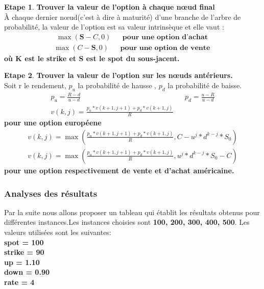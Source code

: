 \documentclass[12pt]{article}
\theoremstyle{definition}
\theoremstyle{definition}
\newtheorem{etape}{Etape}
\begin{document}
\begin{etape}{ \textbf{Trouver la valeur de l’option à chaque nœud final}}\\
\newline
À chaque dernier nœud(c'est à dire à maturité) d’une branche de l’arbre de probabilité, la valeur de l’option est sa valeur intrinsèque et elle vaut :
\boldmath\begin{eqnarray}
\max_{}(\textbf{S} - C, 0) & & \textbf{pour une option d'achat}\
\end{eqnarray}
\boldmath\begin{eqnarray}
\max_{}(C - \textbf{S}, 0) & & \textbf{pour une option de vente}\
\end{eqnarray} 
\textbf{où K est le strike et \textbf{S} est le spot du sous-jacent.}\\
\end{etape}

\begin{etape}{ \textbf{Trouver la valeur de l’option sur les nœuds antérieurs.}}\\
\newline
Soit r le rendement, \textbf{$p_{u}$} la probabilité de hausse , \textbf{$p_{d}$} la probabilité de baisse.
\boldmath\begin{eqnarray}
\textbf{$p_{u}$} = \frac{ R - d}{u - d} && \textbf{$p_{d}$} = \frac{ u - R}{u - d} \\
v(k,j) = \frac{\textbf{$p_{u}$} * v(k+1, j+1) + \textbf{$p_{d}$} * v(k+1, j)}{R} 
\end{eqnarray}
 \textbf{pour une option européene} \\

\boldmath\begin{eqnarray}
v(k,j) = \max_{}(\frac{\textbf{$p_{u}$} * v(k+1, j+1) + \textbf{$p_{d}$} * v(k+1, j)}{R}, C-u^j*d^{k-j}*S_{0}) \\ 
v(k,j) = \max_{}(\frac{\textbf{$p_{u}$} * v(k+1, j+1) + \textbf{$p_{d}$} * v(k+1, j)}{R}, u^j*d^{k-j}*S_{0}-C) 
\end{eqnarray}
\textbf{pour une option respectivement de vente et d'achat américaine.} \\
\end{etape}

\subsubsection{Analyses des résultats}
Par la suite nous allons proposer un tableau qui établit les résultats obtenus pour différentes instances.Les instances choisies sont \textbf{100, 200, 300, 400, 500}. Les valeurs utilisées sont les suivantes:\\
\textbf{spot = 100}\\
\textbf{strike = 90}\\
\textbf{up = 1.10}\\
\textbf{down = 0.90}\\
\textbf{rate = 4}\\
\end{document}
